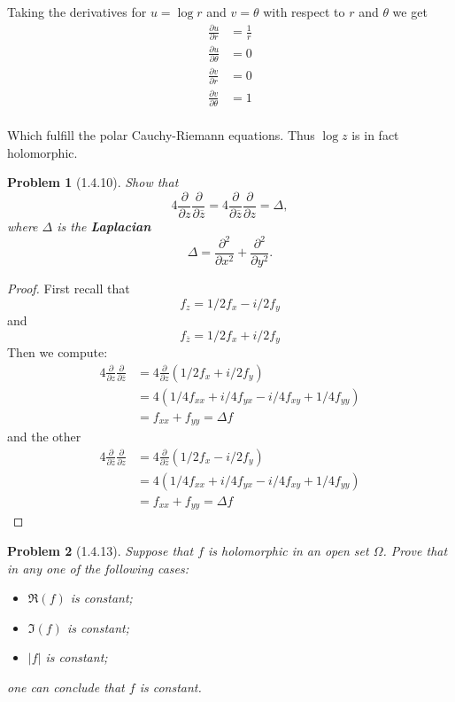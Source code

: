 \documentclass[10pt]{article}
\newcommand{\sk}{\vskip 10mm}
\newcommand{\conj}[1]{\overline{#1}}
\theoremstyle{plain}
\newtheorem{problem}{Problem}
\theoremstyle{remark}
\begin{document}
Taking the derivatives for $u=\log r$ and $v=\theta$ with respect to $r$ and $\theta$ we get
\begin{align*}
  \frac{\partial u}{\partial r} &= \frac{1}{r}\\
  \frac{\partial u}{\partial\theta} &= 0\\
  \frac{\partial v}{\partial r} &= 0\\
  \frac{\partial v}{\partial\theta} &= 1\\
\end{align*}

Which fulfill the polar Cauchy-Riemann equations. Thus $\log z$ is in fact
holomorphic.

\sk

\begin{problem}[1.4.10]
  Show that
  \[
    4\frac{\partial}{\partial z}\frac{\partial}{\partial \conj{z}}=4\frac{\partial}{\partial\conj{z}}\frac{\partial}{\partial z}=\Delta,
  \]
  where $\Delta$ is the \textbf{Laplacian}
  \[
    \Delta = \frac{\partial^2}{\partial x^2}+\frac{\partial^2}{\partial y^2}.
  \]
\end{problem}

\begin{proof}
  First recall that
  \[
    f_z=1/2f_x-i/2f_y
  \]
  and
  \[
    f_{\conj{z}}=1/2f_x+i/2f_y
  \]
  Then we compute:
  \begin{align*}
    4\frac{\partial}{\partial z}\frac{\partial}{\partial\conj{z}} &= 4\frac{\partial}{\partial z}(1/2f_x+i/2f_y)\\
                                                           &= 4(1/4f_{xx}+i/4f_{yx}-i/4f_{xy}+1/4f_{yy})\\
                                                           &= f_{xx}+f_{yy} = \Delta f
  \end{align*}
  and the other
  \begin{align*}
    4\frac{\partial}{\partial \conj{z}}\frac{\partial}{\partial z} &= 4\frac{\partial}{\partial \conj{z}}(1/2f_x-i/2f_y)\\
                                                           &= 4(1/4f_{xx}+i/4f_{yx}-i/4f_{xy}+1/4f_{yy})\\
                                                           &= f_{xx}+f_{yy} = \Delta f
  \end{align*}
\end{proof}

\sk

\begin{problem}[1.4.13]
  Suppose that $f$ is holomorphic in an open set $\Omega$. Prove that in any one
  of the following cases:
  \begin{itemize}
  \item[(a)] $\Re(f)$ is constant;
  \item[(b)] $\Im(f)$ is constant;
  \item[(c)] $|f|$ is constant;
  \end{itemize}
  one can conclude that $f$ is constant.
\end{problem}
\end{document}
